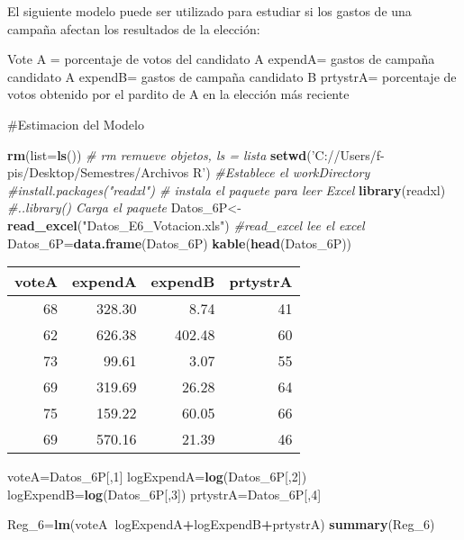 \documentclass[
]{article}
\newenvironment{Shaded}{\begin{snugshade}}{\end{snugshade}}
\newcommand{\CommentTok}[1]{\textcolor[rgb]{0.56,0.35,0.01}{\textit{#1}}}
\newcommand{\DataTypeTok}[1]{\textcolor[rgb]{0.13,0.29,0.53}{#1}}
\newcommand{\DecValTok}[1]{\textcolor[rgb]{0.00,0.00,0.81}{#1}}
\newcommand{\KeywordTok}[1]{\textcolor[rgb]{0.13,0.29,0.53}{\textbf{#1}}}
\newcommand{\NormalTok}[1]{#1}
\newcommand{\OperatorTok}[1]{\textcolor[rgb]{0.81,0.36,0.00}{\textbf{#1}}}
\newcommand{\StringTok}[1]{\textcolor[rgb]{0.31,0.60,0.02}{#1}}
\begin{document}
El siguiente modelo puede ser utilizado para estudiar si los gastos de
una campaña afectan los resultados de la elección:

Vote A = porcentaje de votos del candidato A expendA= gastos de campaña
candidato A expendB= gastos de campaña candidato B prtystrA= porcentaje
de votos obtenido por el pardito de A en la elección más reciente

\#Estimacion del Modelo

\begin{Shaded}
\begin{Highlighting}[]
\KeywordTok{rm}\NormalTok{(}\DataTypeTok{list=}\KeywordTok{ls}\NormalTok{()) }\CommentTok{# rm remueve objetos, ls = lista}
\KeywordTok{setwd}\NormalTok{(}\StringTok{'C://Users/f-pis/Desktop/Semestres/Archivos R'}\NormalTok{) }\CommentTok{#Establece el workDirectory}
\CommentTok{#install.packages("readxl") # instala el paquete para leer Excel }
\KeywordTok{library}\NormalTok{(readxl) }\CommentTok{#..library() Carga el paquete }
\NormalTok{Datos_6P<-}\KeywordTok{read_excel}\NormalTok{(}\StringTok{"Datos_E6_Votacion.xls"}\NormalTok{) }\CommentTok{#read_excel lee el excel}
\NormalTok{Datos_6P=}\KeywordTok{data.frame}\NormalTok{(Datos_6P)}
\KeywordTok{kable}\NormalTok{(}\KeywordTok{head}\NormalTok{(Datos_6P))}
\end{Highlighting}
\end{Shaded}

\begin{longtable}[]{@{}rrrr@{}}
\toprule
voteA & expendA & expendB & prtystrA\tabularnewline
\midrule
\endhead
68 & 328.30 & 8.74 & 41\tabularnewline
62 & 626.38 & 402.48 & 60\tabularnewline
73 & 99.61 & 3.07 & 55\tabularnewline
69 & 319.69 & 26.28 & 64\tabularnewline
75 & 159.22 & 60.05 & 66\tabularnewline
69 & 570.16 & 21.39 & 46\tabularnewline
\bottomrule
\end{longtable}

\begin{Shaded}
\begin{Highlighting}[]
\NormalTok{voteA=Datos_6P[,}\DecValTok{1}\NormalTok{]}
\NormalTok{logExpendA=}\KeywordTok{log}\NormalTok{(Datos_6P[,}\DecValTok{2}\NormalTok{])}
\NormalTok{logExpendB=}\KeywordTok{log}\NormalTok{(Datos_6P[,}\DecValTok{3}\NormalTok{])}
\NormalTok{prtystrA=Datos_6P[,}\DecValTok{4}\NormalTok{]}

\NormalTok{Reg_}\DecValTok{6}\NormalTok{=}\KeywordTok{lm}\NormalTok{(voteA}\OperatorTok{~}\NormalTok{logExpendA}\OperatorTok{+}\NormalTok{logExpendB}\OperatorTok{+}\NormalTok{prtystrA)}
\KeywordTok{summary}\NormalTok{(Reg_}\DecValTok{6}\NormalTok{)}
\end{Highlighting}
\end{Shaded}
\end{document}
